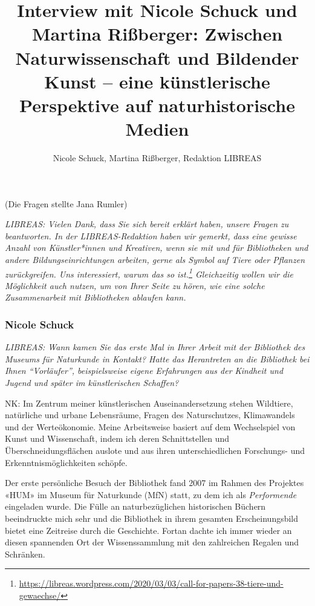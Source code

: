 \documentclass[a4paper,
fontsize=11pt,
oneside,
numbers=noperiodatend,
parskip=half-,
bibliography=totoc,
final
]{scrartcl}
\title{\LARGE{Interview mit Nicole Schuck und Martina Rißberger: Zwischen Naturwissenschaft und Bildender Kunst – eine künstlerische Perspektive auf naturhistorische Medien}}%
\author{Nicole Schuck, Martina Rißberger, Redaktion LIBREAS} %
\date{}
\begin{document}
\maketitle
\thispagestyle{fancyplain} 


(Die Fragen stellte Jana Rumler)

\emph{LIBREAS: Vielen Dank, dass Sie sich bereit erklärt haben, unsere
Fragen zu beantworten. In der LIBREAS-Redaktion haben wir gemerkt, dass
eine gewisse Anzahl von Künstler*innen und Kreativen, wenn sie mit und
für Bibliotheken und andere Bildungseinrichtungen arbeiten, gerne als
Symbol auf Tiere oder Pflanzen zurückgreifen. Uns interessiert, warum
das so ist.\footnote{\url{https://libreas.wordpress.com/2020/03/03/call-for-papers-38-tiere-und-gewaechse/}}
Gleichzeitig wollen wir die Möglichkeit auch nutzen, um von Ihrer Seite
zu hören, wie eine solche Zusammenarbeit mit Bibliotheken ablaufen
kann.}

\hypertarget{nicole-schuck}{%
\subsubsection{Nicole Schuck}\label{nicole-schuck}}

\emph{LIBREAS: Wann kamen Sie das erste Mal in Ihrer Arbeit mit der
Bibliothek des Museums für Naturkunde in Kontakt? Hatte das Herantreten
an die Bibliothek bei Ihnen \enquote{Vorläufer}, beispielsweise eigene
Erfahrungen aus der Kindheit und Jugend und später im künstlerischen
Schaffen?}

NK: Im Zentrum meiner künstlerischen Auseinandersetzung stehen
Wildtiere, natürliche und urbane Lebensräume, Fragen des Naturschutzes,
Klimawandels und der Werteökonomie. Meine Arbeitsweise basiert auf dem
Wechselspiel von Kunst und Wissenschaft, indem ich deren Schnittstellen
und Überschneidungsflächen auslote und aus ihren unterschiedlichen
Forschungs- und Erkenntnismöglichkeiten schöpfe.

Der erste persönliche Besuch der Bibliothek fand 2007 im Rahmen des
Projektes «HUM» im Museum für Naturkunde (MfN) statt, zu dem ich als
\emph{Performende} eingeladen wurde. Die Fülle an naturbezüglichen
historischen Büchern beeindruckte mich sehr und die Bibliothek in ihrem
gesamten Erscheinungsbild bietet eine Zeitreise durch die Geschichte.
Fortan dachte ich immer wieder an diesen spannenden Ort der
Wissenssammlung mit den zahlreichen Regalen und Schränken.
\end{document}
